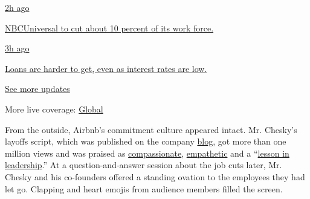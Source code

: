 \href{https://www.nytimes3xbfgragh.onion/live/2020/08/04/business/stock-market-today-coronavirus?action=click\&pgtype=Article\&state=default\&region=MAIN_CONTENT_1\&context=storylines_live_updates\#nbcuniversal-to-cut-about-10-percent-of-its-work-force}{2h
ago}

\href{https://www.nytimes3xbfgragh.onion/live/2020/08/04/business/stock-market-today-coronavirus?action=click\&pgtype=Article\&state=default\&region=MAIN_CONTENT_1\&context=storylines_live_updates\#nbcuniversal-to-cut-about-10-percent-of-its-work-force}{NBCUniversal
to cut about 10 percent of its work force.}

\href{https://www.nytimes3xbfgragh.onion/live/2020/08/04/business/stock-market-today-coronavirus?action=click\&pgtype=Article\&state=default\&region=MAIN_CONTENT_1\&context=storylines_live_updates\#loans-are-harder-to-get-even-as-interest-rates-are-low}{3h
ago}

\href{https://www.nytimes3xbfgragh.onion/live/2020/08/04/business/stock-market-today-coronavirus?action=click\&pgtype=Article\&state=default\&region=MAIN_CONTENT_1\&context=storylines_live_updates\#loans-are-harder-to-get-even-as-interest-rates-are-low}{Loans
are harder to get, even as interest rates are low.}

\href{https://www.nytimes3xbfgragh.onion/live/2020/08/04/business/stock-market-today-coronavirus?action=click\&pgtype=Article\&state=default\&region=MAIN_CONTENT_1\&context=storylines_live_updates}{See
more updates}

More live coverage:
\href{https://www.nytimes3xbfgragh.onion/2020/08/04/world/coronavirus-cases.html?action=click\&pgtype=Article\&state=default\&region=MAIN_CONTENT_1\&context=storylines_live_updates}{Global}

From the outside, Airbnb's commitment culture appeared intact. Mr.
Chesky's layoffs script, which was published on the company
\href{https://news.airbnb.com/a-message-from-co-founder-and-ceo-brian-chesky/}{blog},
got more than one million views and was praised as
\href{https://www.businessinsider.com/airbnb-ceo-brian-chesky-layoffs-show-respect-compassion-for-employees-2020-5}{compassionate},
\href{https://www.prnewsonline.com/airbnb-ceo-delivers-empathetic-transparent-message-regarding-layoffs/}{empathetic}
and a
``\href{https://www.inc.com/jason-aten/lessons-behind-airbnb-ceos-email-about-laying-off-1900-workers.html}{lesson
in leadership}.'' At a question-and-answer session about the job cuts
later, Mr. Chesky and his co-founders offered a standing ovation to the
employees they had let go. Clapping and heart emojis from audience
members filled the screen.


